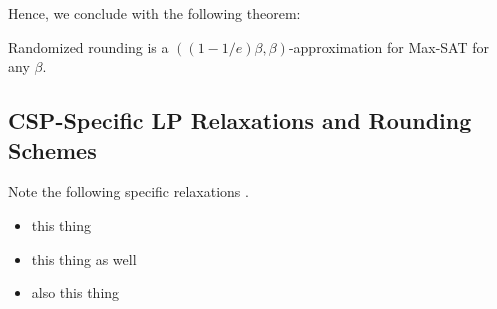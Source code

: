 Hence, we conclude with the following theorem:
\begin{thm}
	Randomized rounding is a $\left( ( 1 - 1/e)\beta, \beta \right)$-approximation for Max-SAT for any $\beta$.
\end{thm}
\subsection{CSP-Specific LP Relaxations and Rounding Schemes}
Note the following specific relaxations \cite{GoeWil94,Asa97,Yan94}.
\begin{itemize}
\item this thing
\item this thing as well
\item also this thing
\end{itemize}


